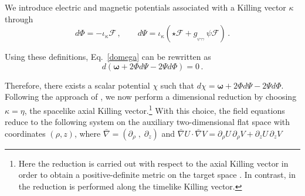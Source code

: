 \documentclass[11pt]{article}
\newcommand{\pa}{\partial}
\numberwithin{equation}{section} %
\begin{document}
We introduce electric and magnetic potentials associated with a Killing vector \(\kappa\) through
%
\begin{equation}
\label{electr_potentials}
    d\Phi=-\iota_\kappa \mathcal{F}\,,\qquad d\Psi=\iota_\kappa\left(\star\mathcal{F}+g_{_{\psi\gamma\gamma}}\,\psi \mathcal{F}\right)\,.
\end{equation}

Using these definitions, Eq.~\eqref{domega} can be rewritten as
%
\begin{equation}
    d\left(\boldsymbol{\omega}+2\Phi d\Psi-2\Psi d\Phi\right)=0\,.
\end{equation}

Therefore, there exists a scalar potential \(\chi\) such that $d\chi=\boldsymbol{\omega}+2\Phi d\Psi-2\Psi d\Phi$. 
Following the approach of \cite{Galtsov:1995zm,Yazadjiev:2010bj,Wells:1998gc}, we now perform a dimensional reduction by choosing \(\kappa = \eta\), the spacelike axial Killing vector.\footnote{Here the reduction is carried out with respect to the axial Killing vector in order to obtain a positive-definite metric on the target space \cite{Yazadjiev:2010bj}. In contrast, in \cite{Galtsov:1995zm} the reduction is performed along the timelike Killing vector.}  With this choice, the field equations reduce to the following system on the auxiliary two-dimensional flat space with coordinates \((\rho,z)\), where
\(\bar{\nabla}=(\pa_\rho\;,\;\pa_z)\) and \(\bar{\nabla} U \cdot \bar{\nabla} V = \partial_\rho U\,\partial_\rho V + \partial_z U\,\partial_z V\)
\end{document}
